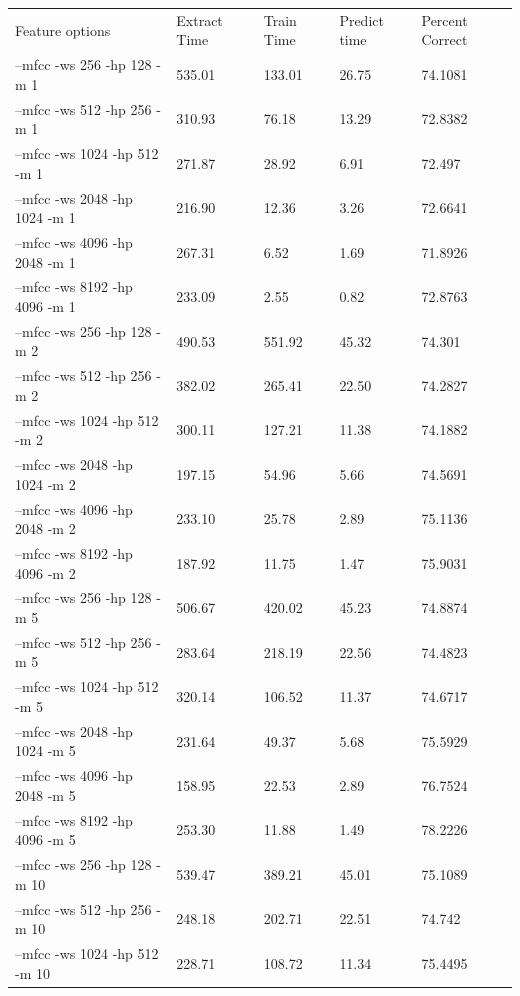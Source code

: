 \documentclass[12pt,oneside]{book}
\begin{document}
\begin{table}
\begin{tabular}{|l|l|l|l|l|}
\hline
Feature options & Extract Time & Train Time & Predict time & Percent Correct \\

--mfcc -ws 256  -hp 128  -m 1   &  535.01 & 133.01 & 26.75 &  74.1081 \\
--mfcc -ws 512  -hp 256  -m 1   &  310.93 &  76.18 & 13.29 &  72.8382 \\
--mfcc -ws 1024 -hp 512  -m 1   &  271.87 &  28.92 &  6.91 &  72.497 \\
--mfcc -ws 2048 -hp 1024 -m 1   &  216.90 &  12.36 &  3.26 &  72.6641 \\
--mfcc -ws 4096 -hp 2048 -m 1   &  267.31 &   6.52 &  1.69 &  71.8926 \\
--mfcc -ws 8192 -hp 4096 -m 1   &  233.09 &   2.55 &  0.82 &  72.8763 \\
--mfcc -ws 256  -hp 128  -m 2   &  490.53 & 551.92 & 45.32 &  74.301 \\
--mfcc -ws 512  -hp 256  -m 2   &  382.02 & 265.41 & 22.50 &  74.2827 \\
--mfcc -ws 1024 -hp 512  -m 2   &  300.11 & 127.21 & 11.38 &  74.1882 \\
--mfcc -ws 2048 -hp 1024 -m 2   &  197.15 &  54.96 &  5.66 &  74.5691 \\
--mfcc -ws 4096 -hp 2048 -m 2   &  233.10 &  25.78 &  2.89 &  75.1136 \\
--mfcc -ws 8192 -hp 4096 -m 2   &  187.92 &  11.75 &  1.47 &  75.9031 \\
--mfcc -ws 256  -hp 128  -m 5   &  506.67 & 420.02 & 45.23 &  74.8874 \\
--mfcc -ws 512  -hp 256  -m 5   &  283.64 & 218.19 & 22.56 &  74.4823 \\
--mfcc -ws 1024 -hp 512  -m 5   &  320.14 & 106.52 & 11.37 &  74.6717 \\
--mfcc -ws 2048 -hp 1024 -m 5   &  231.64 &  49.37 &  5.68 &  75.5929 \\
--mfcc -ws 4096 -hp 2048 -m 5   &  158.95 &  22.53 &  2.89 &  76.7524 \\
--mfcc -ws 8192 -hp 4096 -m 5   &  253.30 &  11.88 &  1.49 &  78.2226 \\
--mfcc -ws 256  -hp 128  -m 10  &  539.47 & 389.21 & 45.01 &  75.1089 \\
--mfcc -ws 512  -hp 256  -m 10  &  248.18 & 202.71 & 22.51 &  74.742 \\
--mfcc -ws 1024 -hp 512  -m 10  &  228.71 & 108.72 & 11.34 &  75.4495 \\

\end{tabular}
\end{table}
\end{document}
